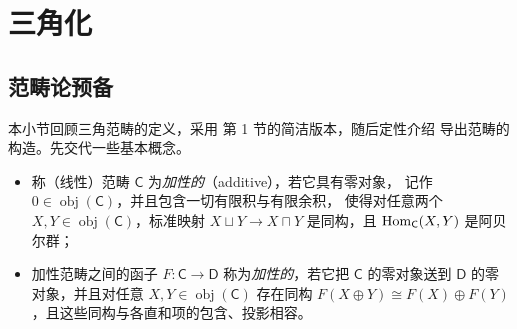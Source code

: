 \section{三角化}\label{ch:03}


\subsection{范畴论预备}\label{sec:3.1}

本小节回顾三角范畴的定义，采用 \cite{May01} 第 1 节的简洁版本，随后定性介绍
导出范畴的构造。先交代一些基本概念。

\begin{Def}\label{def:3.1}
\begin{itemize}
  \item 称（线性）范畴 $\mathsf C$ 为\emph{加性的}（additive），若它具有零对象，
        记作 $0\in\operatorname{obj}(\mathsf C)$，并且包含一切有限积与有限余积，
        使得对任意两个 $X,Y\in\operatorname{obj}(\mathsf C)$，标准映射
        $X\sqcup Y\to X\sqcap Y$ 是同构，且 $\operatorname{Hom}_{\mathsf C}(X,Y)$ 是阿贝尔群；
  \item 加性范畴之间的函子 $F:\mathsf C\to\mathsf D$ 称为\emph{加性的}，若它把
        $\mathsf C$ 的零对象送到 $\mathsf D$ 的零对象，并且对任意
        $X,Y\in\operatorname{obj}(\mathsf C)$ 存在同构
        $F(X\oplus Y)\cong F(X)\oplus F(Y)$，且这些同构与各直和项的包含、投影相容。
\end{itemize}
\end{Def}


